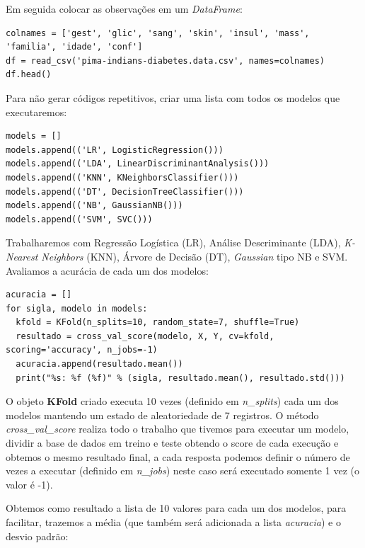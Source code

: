 Em seguida colocar as observações em um \textit{DataFrame}:
\begin{lstlisting}[]
colnames = ['gest', 'glic', 'sang', 'skin', 'insul', 'mass', 'familia', 'idade', 'conf']
df = read_csv('pima-indians-diabetes.data.csv', names=colnames)
df.head()
\end{lstlisting}

Para não gerar códigos repetitivos, criar uma lista com todos os modelos que executaremos:
\begin{lstlisting}[]
models = []
models.append(('LR', LogisticRegression()))
models.append(('LDA', LinearDiscriminantAnalysis()))
models.append(('KNN', KNeighborsClassifier()))
models.append(('DT', DecisionTreeClassifier()))
models.append(('NB', GaussianNB()))
models.append(('SVM', SVC()))
\end{lstlisting}

Trabalharemos com Regressão Logística (LR), Análise Descriminante (LDA), \textit{K-Nearest Neighbors} (KNN), Árvore de Decisão (DT), \textit{Gaussian} tipo NB e SVM. Avaliamos a acurácia de cada um dos modelos:
\begin{lstlisting}[]
acuracia = []
for sigla, modelo in models:
  kfold = KFold(n_splits=10, random_state=7, shuffle=True)
  resultado = cross_val_score(modelo, X, Y, cv=kfold, scoring='accuracy', n_jobs=-1)
  acuracia.append(resultado.mean())
  print("%s: %f (%f)" % (sigla, resultado.mean(), resultado.std())) 
\end{lstlisting}

O objeto \textbf{KFold} criado executa 10 vezes (definido em \textit{n\_splits}) cada um dos modelos mantendo um estado de aleatoriedade de 7 registros. O método \textit{cross\_val\_score} realiza todo o trabalho que tivemos para executar um modelo, dividir a base de dados em treino e teste obtendo o score de cada execução e obtemos o mesmo resultado final, a cada resposta podemos definir o número de vezes a executar (definido em \textit{n\_jobs}) neste caso será executado somente 1 vez (o valor é -1).

Obtemos como resultado a lista de 10 valores para cada um dos modelos, para facilitar, trazemos a média (que também será adicionada a lista \textit{acuracia}) e o desvio padrão: \\

